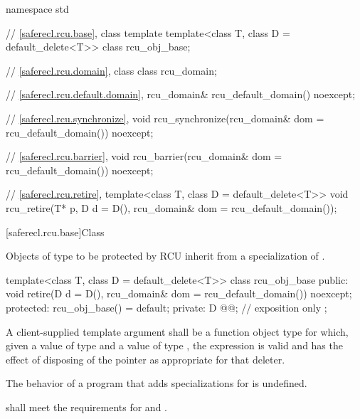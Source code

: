 \begin{codeblock}
namespace std {
  // \ref{saferecl.rcu.base}, class template 
  template<class T, class D = default_delete<T>>
    class rcu_obj_base;

  // \ref{saferecl.rcu.domain}, class 
  class rcu_domain;

  // \ref{saferecl.rcu.default.domain}, 
  rcu_domain& rcu_default_domain() noexcept;

  // \ref{saferecl.rcu.synchronize}, 
  void rcu_synchronize(rcu_domain& dom = rcu_default_domain()) noexcept;

  // \ref{saferecl.rcu.barrier}, 
  void rcu_barrier(rcu_domain& dom = rcu_default_domain()) noexcept;

  // \ref{saferecl.rcu.retire}, 
  template<class T, class D = default_delete<T>>
    void rcu_retire(T* p, D d = D(), rcu_domain& dom = rcu_default_domain());
}
\end{codeblock}

[saferecl.rcu.base]{Class }


Objects of type  to be protected by RCU inherit from a
specialization of .


\begin{codeblock}
template<class T, class D = default_delete<T>>
class rcu_obj_base {
public:
  void retire(D d = D(), rcu_domain& dom = rcu_default_domain()) noexcept;
protected:
  rcu_obj_base() = default;
private:
  D @@;            // exposition only
};
\end{codeblock}

\pnum
A client-supplied template argument  shall be a
function object type  for which,
given a value  of type  and a value 
of type , the expression  is valid and
has the effect of disposing of the pointer as appropriate for
that deleter.

\pnum
The behavior of a program that adds specializations for
 is undefined.

\pnum
{} shall meet the requirements for
 and .

